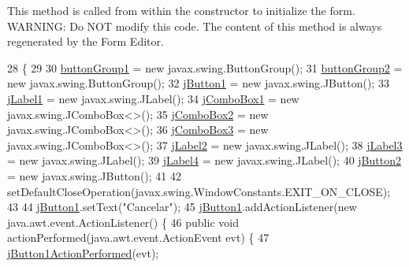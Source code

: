 This method is called from within the constructor to initialize the form. W\+A\+R\+N\+I\+NG\+: Do N\+OT modify this code. The content of this method is always regenerated by the Form Editor. 
\begin{DoxyCode}
28                                   \{
29 
30         \mbox{\hyperlink{classsoftware_1_1parasoftware8_ad6766356a9f5d22c289404b0c23de4a1}{buttonGroup1}} = \textcolor{keyword}{new} javax.swing.ButtonGroup();
31         \mbox{\hyperlink{classsoftware_1_1parasoftware8_a45f1c17ddb073e2fa149a3892aa7e993}{buttonGroup2}} = \textcolor{keyword}{new} javax.swing.ButtonGroup();
32         \mbox{\hyperlink{classsoftware_1_1parasoftware8_a612f7c5f164dcf043b77147fdb81c9ac}{jButton1}} = \textcolor{keyword}{new} javax.swing.JButton();
33         \mbox{\hyperlink{classsoftware_1_1parasoftware8_a0af03810fc1eb91384145459d5d48375}{jLabel1}} = \textcolor{keyword}{new} javax.swing.JLabel();
34         \mbox{\hyperlink{classsoftware_1_1parasoftware8_a29c30cbf2e2cc01d73b81863b7835ff4}{jComboBox1}} = \textcolor{keyword}{new} javax.swing.JComboBox<>();
35         \mbox{\hyperlink{classsoftware_1_1parasoftware8_a71329b43eb81e69956806597744541ab}{jComboBox2}} = \textcolor{keyword}{new} javax.swing.JComboBox<>();
36         \mbox{\hyperlink{classsoftware_1_1parasoftware8_aa9b1b8e891179cb15751500a6d649f88}{jComboBox3}} = \textcolor{keyword}{new} javax.swing.JComboBox<>();
37         \mbox{\hyperlink{classsoftware_1_1parasoftware8_adf24ffebf260f0020405ef0620116cbc}{jLabel2}} = \textcolor{keyword}{new} javax.swing.JLabel();
38         \mbox{\hyperlink{classsoftware_1_1parasoftware8_a4595c84142064d5890fad24684355d2a}{jLabel3}} = \textcolor{keyword}{new} javax.swing.JLabel();
39         \mbox{\hyperlink{classsoftware_1_1parasoftware8_a31d6ce76b8ed34c98cea8fb17bebb099}{jLabel4}} = \textcolor{keyword}{new} javax.swing.JLabel();
40         \mbox{\hyperlink{classsoftware_1_1parasoftware8_a60ca7d4c0d486e0f63581416fddf3225}{jButton2}} = \textcolor{keyword}{new} javax.swing.JButton();
41 
42         setDefaultCloseOperation(javax.swing.WindowConstants.EXIT\_ON\_CLOSE);
43 
44         \mbox{\hyperlink{classsoftware_1_1parasoftware8_a612f7c5f164dcf043b77147fdb81c9ac}{jButton1}}.setText(\textcolor{stringliteral}{"Cancelar"});
45         \mbox{\hyperlink{classsoftware_1_1parasoftware8_a612f7c5f164dcf043b77147fdb81c9ac}{jButton1}}.addActionListener(\textcolor{keyword}{new} java.awt.event.ActionListener() \{
46             \textcolor{keyword}{public} \textcolor{keywordtype}{void} actionPerformed(java.awt.event.ActionEvent evt) \{
47                 \mbox{\hyperlink{classsoftware_1_1parasoftware8_ac91bc1f9d8500c52e17769d1dcecec5b}{jButton1ActionPerformed}}(evt);

\end{DoxyCode}
